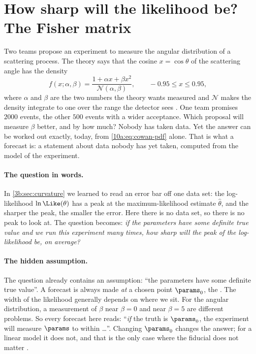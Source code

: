 \section{How sharp will the likelihood be? The Fisher matrix}
\label{10a:sec:fisher}

Two teams propose an experiment to measure the angular distribution of a scattering process. The theory
says that the cosine $x=\cos\theta$ of the scattering angle has the density
\begin{equation}
  f(x;\alpha,\beta)=\frac{1+\alpha x+\beta x^2}{\mathcal N(\alpha,\beta)},\qquad -0.95\le x\le0.95,
  \label{10a:eq:cowan-pdf}
\end{equation}
where $\alpha$ and $\beta$ are the two numbers the theory wants measured and $\mathcal N$ makes the density
integrate to one over the range the detector sees . One team promises
$2000$ events, the other $500$ events with a wider acceptance. Which proposal will measure $\beta$ better,
and by how much? Nobody has taken data. Yet the answer can be worked out exactly, today, from
\eqref{10a:eq:cowan-pdf} alone. That is what a forecast is: a statement about data nobody has yet taken, computed from the model of the experiment.

\paragraph{The question in words.} In \cref{3b:sec:curvature} we learned to read an error bar off one data set:
the log-likelihood $\ln\Like(\theta)$ has a peak at the maximum-likelihood estimate $\hat\theta$, and the
sharper the peak, the smaller the error. Here there is no data set, so there is no peak to look at. The
question becomes: \emph{if the parameters have some definite true value and we run this experiment many
times, how sharp will the peak of the log-likelihood be, on average?}

\paragraph{The hidden assumption.} The question already contains an assumption: ``the parameters have some
definite true value''. A forecast is always made \emph{at} a chosen point $\params_0$, the
 . The width of the likelihood generally depends on where we sit. For the angular
distribution, a measurement of $\beta$ near $\beta=0$ and near $\beta=5$ are different problems. So every
forecast here reads: ``\emph{if} the truth is $\params_0$, the experiment will measure $\params$
to within \dots''. Changing $\params_0$ changes the answer; for a linear model it does not, and that is the
only case where the fiducial does not matter .

